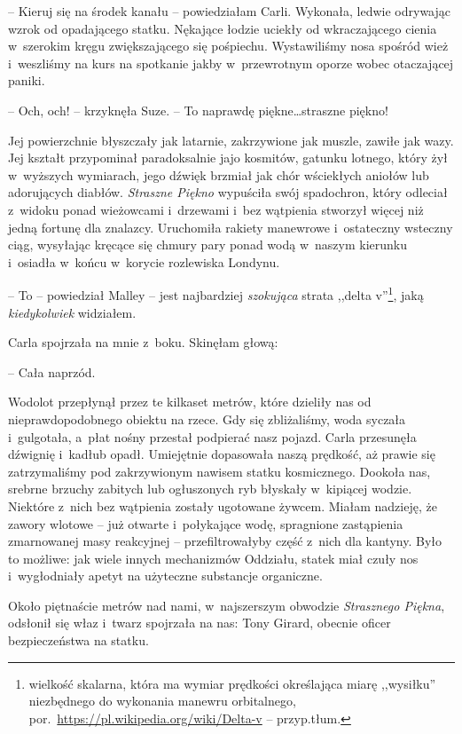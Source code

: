 \documentclass[oneside,polish,11pt,sfheadings]{mwbk}
\begin{document}
-- Kieruj się na środek kanału -- powiedziałam Carli. Wykonała, ledwie
odrywając wzrok od opadającego statku. Nękające łodzie uciekły od
wkraczającego cienia w~szerokim kręgu zwiększającego się pośpiechu.
Wystawiliśmy nosa spośród wież i~weszliśmy na kurs na spotkanie jakby w~przewrotnym oporze wobec otaczającej paniki.

-- Och, och! -- krzyknęła Suze. -- To naprawdę piękne\ldots  straszne piękno!

Jej powierzchnie błyszczały jak latarnie, zakrzywione jak muszle, zawiłe
jak wazy. Jej kształt przypominał paradoksalnie jajo kosmitów, gatunku
lotnego, który żył w~wyższych wymiarach, jego dźwięk brzmiał jak chór
wściekłych aniołów lub adorujących diabłów. \textit{Straszne Piękno}
wypuściła swój spadochron, który odleciał z~widoku ponad wieżowcami i~drzewami i~bez wątpienia stworzył więcej niż jedną fortunę dla znalazcy.
Uruchomiła rakiety manewrowe i~ostateczny wsteczny ciąg, wysyłając
kręcące się chmury pary ponad wodą w~naszym kierunku i~osiadła w~końcu w~korycie rozlewiska Londynu.

-- To -- powiedział Malley -- jest najbardziej \textit{szokująca} strata
,,delta v''\footnote{wielkość skalarna, która ma wymiar prędkości określająca
miarę ,,wysiłku'' niezbędnego do wykonania manewru orbitalnego,
por.~\url{https://pl.wikipedia.org/wiki/Delta-v} -- przyp.tłum.}, jaką \textit{kiedykolwiek} widziałem.

Carla spojrzała na mnie z~boku. Skinęłam głową: 

-- Cała naprzód. 

Wodolot przepłynął przez te kilkaset metrów, które dzieliły nas od
nieprawdopodobnego obiektu na rzece. Gdy się zbliżaliśmy, woda syczała i~gulgotała, a~płat nośny przestał podpierać nasz pojazd. Carla przesunęła
dźwignię i~kadłub opadł. Umiejętnie dopasowała naszą prędkość, aż prawie
się zatrzymaliśmy pod zakrzywionym nawisem statku kosmicznego. Dookoła
nas, srebrne brzuchy zabitych lub ogłuszonych ryb błyskały w~kipiącej
wodzie. Niektóre z~nich bez wątpienia zostały ugotowane żywcem. Miałam
nadzieję, że zawory wlotowe -- już otwarte i~połykające wodę, spragnione
zastąpienia zmarnowanej masy reakcyjnej -- przefiltrowałyby część z~nich
dla kantyny. Było to możliwe: jak wiele innych mechanizmów Oddziału,
statek miał czuły nos i~wygłodniały apetyt na użyteczne substancje
organiczne.

Około piętnaście metrów nad nami, w~najszerszym obwodzie
\textit{Strasznego Piękna}, odsłonił się właz i~twarz spojrzała na nas:
Tony Girard, obecnie oficer bezpieczeństwa na statku.
\end{document}
